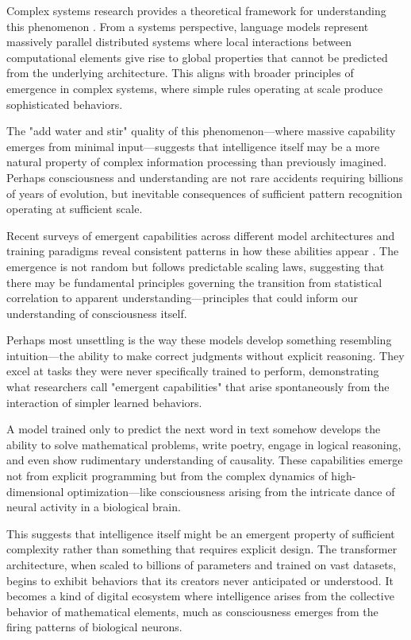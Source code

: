 Complex systems research provides a theoretical framework for understanding this phenomenon \parencite{krakauer2025large}. From a systems perspective, language models represent massively parallel distributed systems where local interactions between computational elements give rise to global properties that cannot be predicted from the underlying architecture. This aligns with broader principles of emergence in complex systems, where simple rules operating at scale produce sophisticated behaviors.

The "add water and stir" quality of this phenomenon—where massive capability emerges from minimal input—suggests that intelligence itself may be a more natural property of complex information processing than previously imagined. Perhaps consciousness and understanding are not rare accidents requiring billions of years of evolution, but inevitable consequences of sufficient pattern recognition operating at sufficient scale.

Recent surveys of emergent capabilities across different model architectures and training paradigms reveal consistent patterns in how these abilities appear \parencite{berti2025emergent}. The emergence is not random but follows predictable scaling laws, suggesting that there may be fundamental principles governing the transition from statistical correlation to apparent understanding—principles that could inform our understanding of consciousness itself.

Perhaps most unsettling is the way these models develop something resembling intuition—the ability to make correct judgments without explicit reasoning. They excel at tasks they were never specifically trained to perform, demonstrating what researchers call "emergent capabilities" that arise spontaneously from the interaction of simpler learned behaviors.

A model trained only to predict the next word in text somehow develops the ability to solve mathematical problems, write poetry, engage in logical reasoning, and even show rudimentary understanding of causality. These capabilities emerge not from explicit programming but from the complex dynamics of high-dimensional optimization—like consciousness arising from the intricate dance of neural activity in a biological brain.

This suggests that intelligence itself might be an emergent property of sufficient complexity rather than something that requires explicit design. The transformer architecture, when scaled to billions of parameters and trained on vast datasets, begins to exhibit behaviors that its creators never anticipated or understood. It becomes a kind of digital ecosystem where intelligence arises from the collective behavior of mathematical elements, much as consciousness emerges from the firing patterns of biological neurons.

